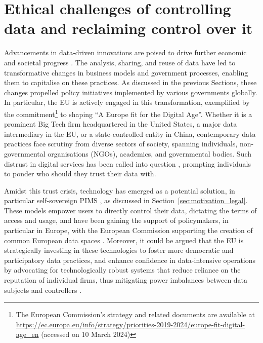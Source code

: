 \section{Ethical challenges of controlling data and reclaiming control over it}
\label{sec:ethical_challenges}

Advancements in data-driven innovations are poised to drive further economic and societal progress \citep{jacobides_platforms_2019}.
The analysis, sharing, and reuse of data have led to transformative changes in business models and government processes, enabling them to capitalise on these practices. 
As discussed in the previous Sections, these changes propelled policy initiatives implemented by various governments globally.
In particular, the EU is actively engaged in this transformation, exemplified by the \cite{european_commission_communication_2020} commitment\footnote{The European Commission's strategy and related documents are available at \url{https://ec.europa.eu/info/strategy/priorities-2019-2024/europe-fit-digital-age_en} (accessed on 10 March 2024)} to shaping ``A Europe fit for the Digital Age''. 
Whether it is a prominent Big Tech firm headquartered in the United States, a major data intermediary in the EU, or a state-controlled entity in China, contemporary data practices face scrutiny from diverse sectors of society, spanning individuals, non-governmental organisations (NGOs), academics, and governmental bodies.
Such distrust in digital services has been called into question \citep{waldman_industry_2021}, prompting individuals to ponder who should they trust their data with.

Amidst this trust crisis, technology has emerged as a potential solution, in particular self-sovereign PIMS \citep{chomczyk_penedo_selfsovereign_2021}, as discussed in Section~\ref{sec:motivation_legal}.
These models empower users to directly control their data, dictating the terms of access and usage, and have been gaining the support of policymakers, in particular in Europe, with the European Commission supporting the creation of common European data spaces \citeyearpar{noauthor_commission_2022}.
Moreover, it could be argued that the EU is strategically investing in these technologies to foster more democratic and participatory data practices, and enhance confidence in data-intensive operations by advocating for technologically robust systems that reduce reliance on the reputation of individual firms, thus mitigating power imbalances between data subjects and controllers \citep{european_commission_communication_2020}.

